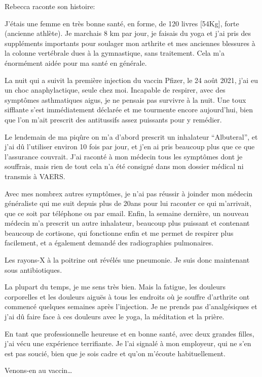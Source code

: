 Rebecca raconte son histoire:

J'étais une femme en très bonne santé, en forme, de 120 livres [54Kg], forte
(ancienne athlète). Je marchais 8 km par jour, je faisais du yoga et j'ai pris
des suppléments importants pour soulager mon arthrite et mes anciennes blessures
à la colonne vertébrale dues à la gymnastique, sans traitement. Cela m'a
énormément aidée pour ma santé en générale.

La nuit qui a suivit la première injection du vaccin Pfizer, le 24 août 2021,
j'ai eu un choc anaphylactique, seule chez moi. Incapable de respirer, avec des
symptômes asthmatiques aigus, je ne pensais pas survivre à la nuit. Une toux
sifflante s'est immédiatement déclarée et me tourmente encore aujourd'hui, bien
que l'on m'ait prescrit des antitussifs assez puissants pour y remédier.

Le lendemain de ma piqûre on m'a d'abord prescrit un inhalateur “Albuteral”, et
j'ai dû l'utiliser environ 10 fois par jour, et j'en ai pris beaucoup plus que
ce que l'assurance couvrait. J'ai raconté à mon médecin tous les symptômes dont
je souffrais, mais rien de tout cela n'a été consigné dans mon dossier médical
ni transmis à VAERS.

Avec mes nombrex autres symptômes, je n'ai pas réussir à joinder mon médecin
généraliste qui me suit depuis plus de 20ans pour lui raconter ce qui
m'arrivait, que ce soit par téléphone ou par email. Enfin, la semaine dernière,
un nouveau médecin m'a prescrit un autre inhalateur, beaucoup plus puissant et
contenant beaucoup de cortisone, qui fonctionne enfin et me permet de respirer
plus facilement, et a également demandé des radiographies pulmonaires.

Les rayons-X à la poitrine ont révélés une pneumonie. Je suis donc maintenant
sous antibiotiques.

La plupart du temps, je me sens très bien. Mais la fatigue, les douleurs
corporelles et les douleurs aiguës à tous les endroits où je souffre d'arthrite
ont commencé quelques semaines après l'injection. Je ne prends pas
d'analgésiques et j'ai dû faire face à ces douleurs avec le yoga, la méditation
et la prière.

En tant que professionnelle heureuse et en bonne santé, avec deux grandes
filles, j'ai vécu une expérience terrifiante. Je l'ai signalé à mon employeur,
qui ne s'en est pas soucié, bien que je sois cadre et qu'on m'écoute
habituellement.

Venons-en au vaccin…

